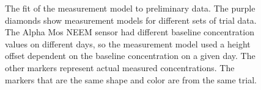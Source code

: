 \documentclass[submit, 12pt]{aiaa-pretty-modified}
\begin{document}
\begin{figure}
\begin{center}
\caption[Fit of model parameters to preliminary data.]{
  The fit of the measurement model to preliminary data. The purple
  diamonds show measurement models for different sets of trial data. The Alpha
  Mos NEEM sensor had different baseline concentration values on different days,
  so the measurement model used a height offset dependent on the baseline
  concentration on a given day. The other markers represent actual measured
  concentrations. The markers that are the same shape and color are from the
  same trial.}
\label{fig:model-fit}
\end{center}
\end{figure}

\begin{table}
\caption{Measurement model height offsets.}
\centering
{}
\label{tab:height-offset}
\end{table}
\end{document}
